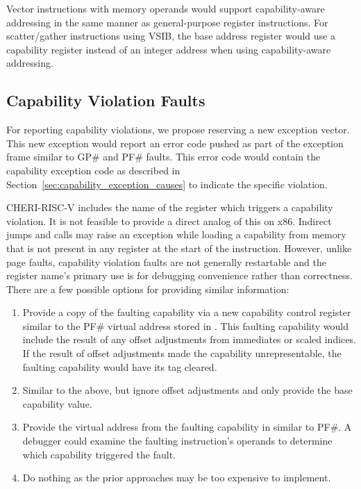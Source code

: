 Vector instructions with memory operands would support
capability-aware addressing in the same manner as general-purpose
register instructions.  For scatter/gather instructions using VSIB,
the base address register would use a capability register instead of
an integer address when using capability-aware addressing.

\subsection{Capability Violation Faults}
\label{sec:x86:capability-fault}

For reporting capability violations, we propose reserving a new
exception vector.  This new exception would report an error code
pushed as part of the exception frame similar to GP\# and PF\# faults.
This error code would contain the capability exception code as
described in Section~\ref{sec:capability_exception_causes} to indicate
the specific violation.

CHERI-RISC-V includes the name of the register which
triggers a capability violation.  It is not feasible to provide a
direct analog of this on x86.  Indirect jumps and calls may raise an
exception while loading a capability from memory that is not present
in any register at the start of the instruction.  However, unlike page
faults, capability violation faults are not generally restartable and
the register name's primary use is for debugging convenience rather than
correctness.  There are a few possible options for providing similar
information:

\begin{enumerate}
\item Provide a copy of the faulting capability via a new capability
  control register similar to the PF\# virtual address stored in
  \CRTWO{}.  This faulting capability would include the result of any
  offset adjustments from immediates or scaled indices.  If the result
  of offset adjustments made the capability unrepresentable, the
  faulting capability would have its tag cleared.
\item Similar to the above, but ignore offset adjustments and only
  provide the base capability value.
\item Provide the virtual address from the faulting capability in
  \CRTWO{} similar to PF\#.  A debugger could examine the faulting
  instruction's operands to determine which capability triggered the fault.
\item Do nothing as the prior approaches may be too expensive to
  implement.
\end{enumerate}

